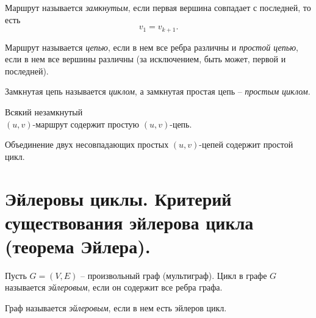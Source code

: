 \begin{definition}
    Маршрут называется \emph{замкнутым}, если первая вершина совпадает с последней, то есть
    \[
        v_1=v_{k+1}.
    \]
\end{definition}

\begin{definition}
    Маршрут называется \emph{цепью}, если в нем все ребра различны и \emph{простой цепью}, если в нем все вершины различны (за исключением, быть может, первой и последней).
    \begin{figure}[H]
        \centering
        \label{fig:fig_05}
    \end{figure}
\end{definition}

\begin{definition}
    Замкнутая цепь называется \emph{циклом}, а замкнутая простая цепь -- \emph{простым циклом}.
    \begin{figure}[H]
        \centering
        \label{fig:fig_06}
    \end{figure}
\end{definition}

\begin{lemma}
    Всякий незамкнутый \\ $ (u,v) $-маршрут содержит простую $ (u,v) $-цепь.
\end{lemma}

\begin{lemma}
    Объединение двух несовпадающих простых $ (u,v) $-цепей содержит простой цикл.
\end{lemma}

\section{Эйлеровы циклы. Критерий существования эйлерова цикла (теорема Эйлера).}

\begin{definition}
    Пусть $ G = (V,E) $ -- произвольный граф (мультиграф). Цикл в графе $ G $ называется \emph{эйлеровым}, если он содержит все ребра графа.
\end{definition}

\begin{definition}
    Граф называется \emph{эйлеровым}, если в нем есть эйлеров цикл.
\end{definition}

